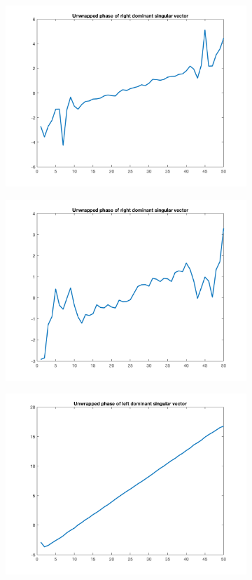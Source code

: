 \begin{figure}[htpb]
\begin{subfigure}{.25\textwidth}
\includegraphics[width=1\textwidth]{img/Hoge1DXSigma150}
\end{subfigure}%
\begin{subfigure}{.25\textwidth}
\includegraphics[width=1\textwidth]{img/Hoge1DXSigma300}
\end{subfigure}
\quad
\begin{subfigure}{.25\textwidth}
\includegraphics[width=1\textwidth]{img/Hoge1DYSigma0}

\end{subfigure}
\end{figure}
